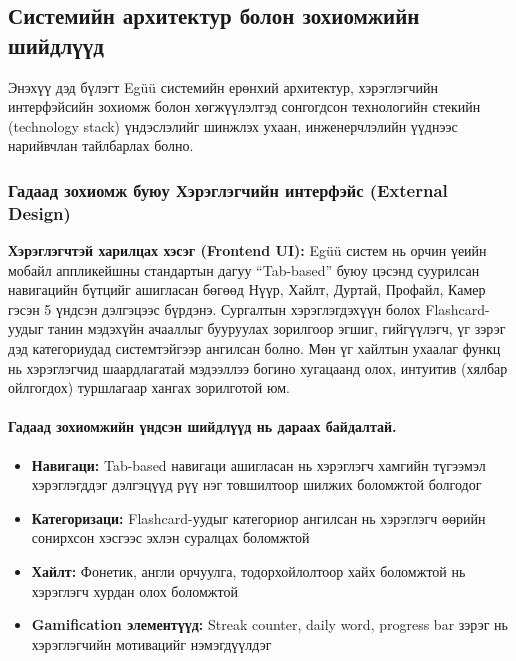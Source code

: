 \subsection{Системийн архитектур болон зохиомжийн шийдлүүд}
\label{subsec:design-decisions}

Энэхүү дэд бүлэгт Egüü системийн ерөнхий архитектур, хэрэглэгчийн интерфэйсийн зохиомж болон хөгжүүлэлтэд сонгогдсон технологийн стекийн (technology stack) үндэслэлийг шинжлэх ухаан, инженерчлэлийн үүднээс нарийвчлан тайлбарлах болно.

\subsubsection{Гадаад зохиомж буюу Хэрэглэгчийн интерфэйс (External Design)}

\textbf{Хэрэглэгчтэй харилцах хэсэг (Frontend UI):} Egüü систем нь орчин үеийн мобайл аппликейшны стандартын дагуу ``Tab-based'' буюу цэсэнд суурилсан навигацийн бүтцийг ашигласан бөгөөд Нүүр, Хайлт, Дуртай, Профайл, Камер гэсэн 5 үндсэн дэлгэцээс бүрдэнэ. Сургалтын хэрэглэгдэхүүн болох Flashcard-уудыг танин мэдэхүйн ачааллыг бууруулах зорилгоор эгшиг, гийгүүлэгч, үг зэрэг дэд категориудад системтэйгээр ангилсан болно. Мөн үг хайлтын ухаалаг функц нь хэрэглэгчид шаардлагатай мэдээллээ богино хугацаанд олох, интуитив (хялбар ойлгогдох) туршлагаар хангах зорилготой юм.

\paragraph{Гадаад зохиомжийн үндсэн шийдлүүд нь дараах байдалтай.}

\begin{itemize}
    \item \textbf{Навигаци:} Tab-based навигаци ашигласан нь хэрэглэгч хамгийн түгээмэл хэрэглэгддэг дэлгэцүүд рүү нэг товшилтоор шилжих боломжтой болгодог
    
    \item \textbf{Категоризаци:} Flashcard-уудыг категориор ангилсан нь хэрэглэгч өөрийн сонирхсон хэсгээс эхлэн суралцах боломжтой
    
    \item \textbf{Хайлт:} Фонетик, англи орчуулга, тодорхойлолтоор хайх боломжтой нь хэрэглэгч хурдан олох боломжтой
    
    \item \textbf{Gamification элементүүд:} Streak counter, daily word, progress bar зэрэг нь хэрэглэгчийн мотивацийг нэмэгдүүлдэг
\end{itemize}

